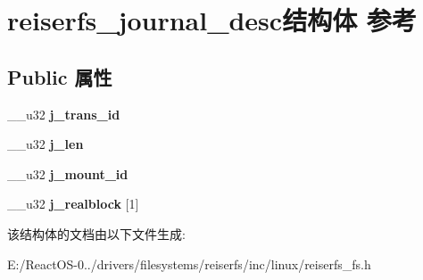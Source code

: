 \hypertarget{structreiserfs__journal__desc}{}\section{reiserfs\+\_\+journal\+\_\+desc结构体 参考}
\label{structreiserfs__journal__desc}
\subsection*{Public 属性}
\begin{DoxyCompactItemize}
\item 
\mbox{\label{structreiserfs__journal__desc_a0fbaafcca0259a37ba815f9a04a525df}} 
\+\_\+\+\_\+u32 {\bfseries j\+\_\+trans\+\_\+id}
\item 
\mbox{\label{structreiserfs__journal__desc_a265396e9bfa4dc0c7a5ec3b0f7521a6e}} 
\+\_\+\+\_\+u32 {\bfseries j\+\_\+len}
\item 
\mbox{\label{structreiserfs__journal__desc_a5d6d40c50b6acbf50bbf9a2dd63ea475}} 
\+\_\+\+\_\+u32 {\bfseries j\+\_\+mount\+\_\+id}
\item 
\mbox{\label{structreiserfs__journal__desc_ad0d986bf1024c498527731ae2c6cbea4}} 
\+\_\+\+\_\+u32 {\bfseries j\+\_\+realblock} \mbox{[}1\mbox{]}
\end{DoxyCompactItemize}


该结构体的文档由以下文件生成\+:\begin{DoxyCompactItemize}
\item 
E\+:/\+React\+O\+S-\/0../drivers/filesystems/reiserfs/inc/linux/reiserfs\+\_\+fs.\+h\end{DoxyCompactItemize}
